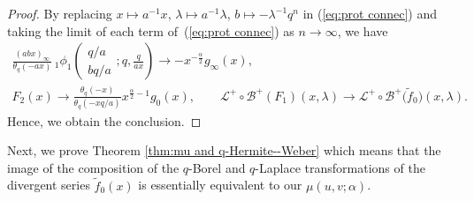 \documentclass[pdftex]{sigma}
\numberwithin{equation}{section}
\theoremstyle{definition}
\begin{document}
\begin{proof}
By replacing $x\mapsto a^{-1}x$, $\lambda\mapsto a^{-1}\lambda$, $b\mapsto-\lambda^{-1}q^n$ in (\ref{eq:prot connec}) and taking the limit of each term of~(\ref{eq:prot connec}) as $n\to\infty$, we have
\begin{gather*}
 \frac{(abx)_\infty}{\theta_q(-ax)}\,{}_1\phi_1\left(\begin{matrix}q/a\\ bq/a\end{matrix};q,\frac{q}{ax}\right)\to-x^{-\frac{\alpha}{2}}g_{\infty }(x), \\
 F_2(x)\to\frac{\theta_q(-x)}{\theta_q(-xq/a)}x^{\frac{\alpha}{2}-1}g_0(x), \qquad
 \mathcal{L}^{+}\circ\mathcal{B}^{+}(F_1)(x,\lambda)\to \mathcal{L}^{+}\circ\mathcal{B}^{+}\big(\widetilde{f}_{0}\big)(x,\lambda).
\end{gather*}
Hence, we obtain the conclusion.
\end{proof}

Next, we prove Theorem \ref{thm:mu and q-Hermite--Weber} which means that the image of the composition of the $q$-Borel and $q$-Laplace transformations of the divergent series $\widetilde{f}_{0}(x)$ is essentially equivalent to our $\mu (u,v;\alpha)$.
\end{document}
